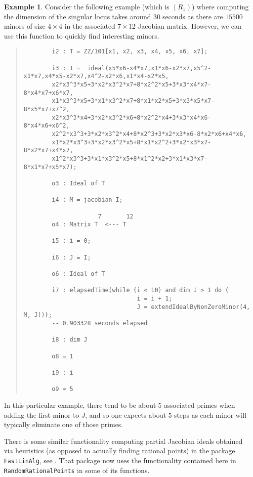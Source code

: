 \documentclass[11pt]{amsart}
\theoremstyle{definition}
\newtheorem{example}{Example}[section]
\begin{document}
\begin{example}
    Consider the following example (which is $(R_1)$) where computing the dimension of the singular locus takes around $30$ seconds as there are $15500$ minors of size $4 \times 4$ in the associated $7 \times 12$ Jacobian matrix.  However, we can use this function to quickly find interesting minors.
  {{\small\color{blue}
  \begin{quote}
\begin{verbatim}
		i2 : T = ZZ/101[x1, x2, x3, x4, x5, x6, x7];
		
		i3 : I =  ideal(x5*x6-x4*x7,x1*x6-x2*x7,x5^2-x1*x7,x4*x5-x2*x7,x4^2-x2*x6,x1*x4-x2*x5,
		x2*x3^3*x5+3*x2*x3^2*x7+8*x2^2*x5+3*x3*x4*x7-8*x4*x7+x6*x7,
		x1*x3^3*x5+3*x1*x3^2*x7+8*x1*x2*x5+3*x3*x5*x7-8*x5*x7+x7^2,
		x2*x3^3*x4+3*x2*x3^2*x6+8*x2^2*x4+3*x3*x4*x6-8*x4*x6+x6^2,
		x2^2*x3^3+3*x2*x3^2*x4+8*x2^3+3*x2*x3*x6-8*x2*x6+x4*x6,
		x1*x2*x3^3+3*x2*x3^2*x5+8*x1*x2^2+3*x2*x3*x7-8*x2*x7+x4*x7,
		x1^2*x3^3+3*x1*x3^2*x5+8*x1^2*x2+3*x1*x3*x7-8*x1*x7+x5*x7);
		
		o3 : Ideal of T
		
		i4 : M = jacobian I;
		
		             7       12
		o4 : Matrix T  <--- T
		
		i5 : i = 0;
		
		i6 : J = I;
		
		o6 : Ideal of T
		
		i7 : elapsedTime(while (i < 10) and dim J > 1 do (
                                i = i + 1; 
                                J = extendIdealByNonZeroMinor(4, M, J)));
		-- 0.903328 seconds elapsed
		
		i8 : dim J
		
		o8 = 1
		
		i9 : i
		
		o9 = 5
\end{verbatim}
\end{quote}
    }}    
    \noindent
    In this particular example, there tend to be about $5$ associated primes when adding the first minor to $J$, and so one expects about $5$ steps as each minor will typically eliminate one of those primes.
\end{example} 

There is some similar functionality computing partial Jacobian ideals obtained via heuristics (as opposed to actually finding rational points) in the package {\tt FastLinAlg}, see \cite{FastLinAlgSource}.  That package now uses the functionality contained here in {\tt RandomRationalPoints} in some of its functions.




\end{document}
